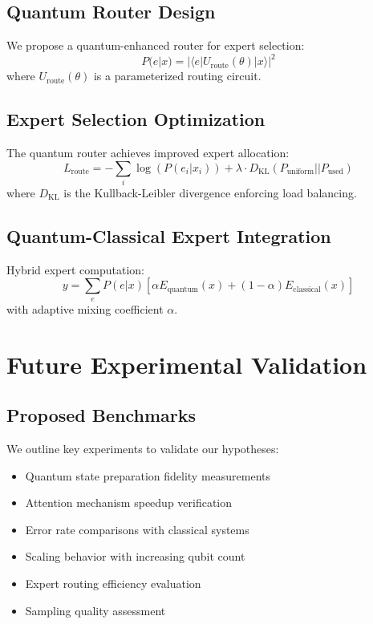 \documentclass{article}
\begin{document}
\subsection{Quantum Router Design}
We propose a quantum-enhanced router for expert selection:
\begin{equation}
P(e|x) = |\langle e|U_{\text{route}}(\theta)|x\rangle|^2
\end{equation}
where $U_{\text{route}}(\theta)$ is a parameterized routing circuit.

\subsection{Expert Selection Optimization}
The quantum router achieves improved expert allocation:
\begin{equation}
L_{\text{route}} = -\sum_i \log(P(e_i|x_i)) + \lambda \cdot D_{\text{KL}}(P_{\text{uniform}}||P_{\text{used}})
\end{equation}
where $D_{\text{KL}}$ is the Kullback-Leibler divergence enforcing load balancing.

\subsection{Quantum-Classical Expert Integration}
Hybrid expert computation:
\begin{equation}
y = \sum_e P(e|x)[\alpha E_{\text{quantum}}(x) + (1-\alpha)E_{\text{classical}}(x)]
\end{equation}
with adaptive mixing coefficient $\alpha$.

\section{Future Experimental Validation}

\subsection{Proposed Benchmarks}
We outline key experiments to validate our hypotheses:

\begin{itemize}
\item Quantum state preparation fidelity measurements
\item Attention mechanism speedup verification
\item Error rate comparisons with classical systems
\item Scaling behavior with increasing qubit count
\item Expert routing efficiency evaluation
\item Sampling quality assessment
\end{itemize}
\end{document}
